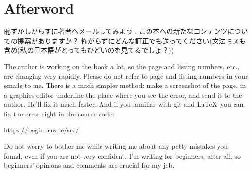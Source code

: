 \part*{Afterword}


恥ずかしがらずに著者へメールしてみよう
\GTT{\EMAILS}.
この本への新たなコンテンツについての提案がありますか？
怖がらずにどんな訂正でも送ってください(文法ミスも含め(私の日本語がとってもひどいのを見てるでしょ？))

The author is working on the book a lot, so the page and listing numbers, etc., are changing very rapidly.
Please do not refer to page and listing numbers in your emails to me.
There is a much simpler method: make a screenshot of the page, in a graphics editor underline the place where you see the error,
and send it to the author. He'll fix it much faster.
And if you familiar with git and \LaTeX\, you can fix the error right in the source code: 

\url{https://beginners.re/src/}.

Do not worry to bother me while writing me about any petty mistakes you found, even if you are not very confident.
I'm writing for beginners, after all, so beginners' opinions and comments are crucial for my job.
